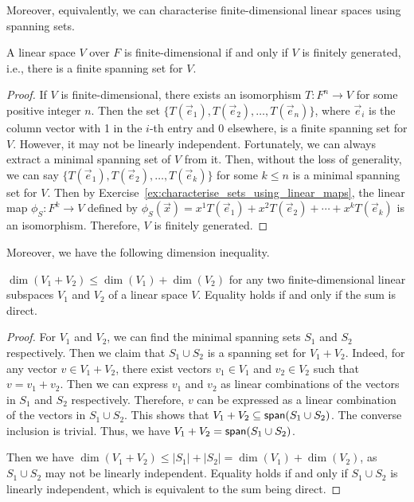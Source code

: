 Moreover, equivalently, we can characterise finite-dimensional linear spaces using spanning sets.
\begin{proposition}
  A linear space $V$ over $F$ is finite-dimensional if and only if $V$ is finitely generated, i.e., there is a finite spanning set for $V$.
\end{proposition}
\begin{proof}
  If $V$ is finite-dimensional, there exists an isomorphism $T \colon F^n \to V$ for some positive integer $n$. Then the set $\{ T(\vec{e}_1), T(\vec{e}_2), \ldots, T(\vec{e}_n) \}$, where $\vec{e}_i$ is the column vector with 1 in the $i$-th entry and 0 elsewhere, is a finite spanning set for $V$. However, it may not be linearly independent. Fortunately, we can always extract a minimal spanning set of $V$ from it. Then, without the loss of generality, we can say $\{ T(\vec{e}_1), T(\vec{e}_2), \ldots, T(\vec{e}_k) \}$ for some $k \leq n$ is a minimal spanning set for $V$. Then by Exercise~\ref{ex:characterise_sets_using_linear_maps}, the linear map $\phi_S \colon F^k \to V$ defined by $\phi_S(\vec{x}) = x^1 T(\vec{e}_1) + x^2 T(\vec{e}_2) + \cdots + x^k T(\vec{e}_k)$ is an isomorphism. Therefore, $V$ is finitely generated.
\end{proof}

Moreover, we have the following dimension inequality.
\begin{proposition}\label{prop:dimension_inequality}
  $\dim(V_1 + V_2) \leq \dim(V_1) + \dim(V_2)$ for any two finite-dimensional linear subspaces $V_1$ and $V_2$ of a linear space $V$. Equality holds if and only if the sum is direct.
\end{proposition}
\begin{proof}
  For $V_1$ and $V_2$, we can find the minimal spanning sets $S_1$ and $S_2$ respectively. Then we claim that $S_1 \cup S_2$ is a spanning set for $V_1 + V_2$. Indeed, for any vector $v \in V_1 + V_2$, there exist vectors $v_1 \in V_1$ and $v_2 \in V_2$ such that $v = v_1 + v_2$. Then we can express $v_1$ and $v_2$ as linear combinations of the vectors in $S_1$ and $S_2$ respectively. Therefore, $v$ can be expressed as a linear combination of the vectors in $S_1 \cup S_2$. This shows that $V_1 + V_2 \subseteq \operatorname{\text{\normalfont\sffamily span}}(S_1 \cup S_2)$. The converse inclusion is trivial. Thus, we have $V_1 + V_2 = \operatorname{\text{\normalfont\sffamily span}}(S_1 \cup S_2)$.

  Then we have $\dim(V_1 + V_2) \leq |S_1| + |S_2| = \dim(V_1) + \dim(V_2)$, as $S_1 \cup S_2$ may not be linearly independent. Equality holds if and only if $S_1 \cup S_2$ is linearly independent, which is equivalent to the sum being direct.
\end{proof}

